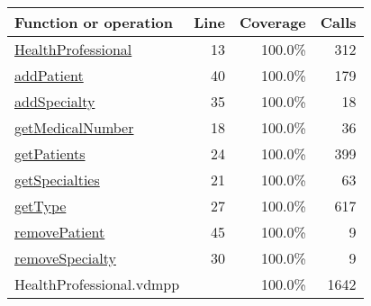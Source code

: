 \begin{longtable}{|l|r|r|r|}
\hline
Function or operation & Line & Coverage & Calls \\
\hline
\hline
\hyperref[HealthProfessional:13]{HealthProfessional} & 13&100.0\% & 312 \\
\hline
\hyperref[addPatient:40]{addPatient} & 40&100.0\% & 179 \\
\hline
\hyperref[addSpecialty:35]{addSpecialty} & 35&100.0\% & 18 \\
\hline
\hyperref[getMedicalNumber:18]{getMedicalNumber} & 18&100.0\% & 36 \\
\hline
\hyperref[getPatients:24]{getPatients} & 24&100.0\% & 399 \\
\hline
\hyperref[getSpecialties:21]{getSpecialties} & 21&100.0\% & 63 \\
\hline
\hyperref[getType:27]{getType} & 27&100.0\% & 617 \\
\hline
\hyperref[removePatient:45]{removePatient} & 45&100.0\% & 9 \\
\hline
\hyperref[removeSpecialty:30]{removeSpecialty} & 30&100.0\% & 9 \\
\hline
\hline
HealthProfessional.vdmpp & & 100.0\% & 1642 \\
\hline
\end{longtable}

